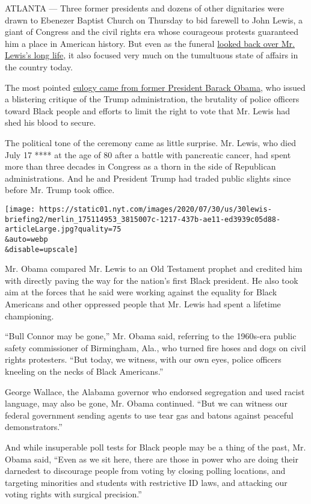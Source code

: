 ATLANTA --- Three former presidents and dozens of other dignitaries were
drawn to Ebenezer Baptist Church on Thursday to bid farewell to John
Lewis, a giant of Congress and the civil rights era whose courageous
protests guaranteed him a place in American history. But even as the
funeral
\href{https://www.nytimes.com/2020/07/17/us/john-lewis-dead.html}{looked
back over Mr. Lewis's long life}, it also focused very much on the
tumultuous state of affairs in the country today.

The most pointed
\href{https://www.nytimes.com/2020/07/30/us/obama-eulogy-john-lewis-full-transcript.html}{eulogy
came from former President Barack Obama}, who issued a blistering
critique of the Trump administration, the brutality of police officers
toward Black people and efforts to limit the right to vote that Mr.
Lewis had shed his blood to secure.

The political tone of the ceremony came as little surprise. Mr. Lewis,
who died July 17 **** at the age of 80 after a battle with pancreatic
cancer, had spent more than three decades in Congress as a thorn in the
side of Republican administrations. And he and President Trump had
traded public slights since before Mr. Trump took office.

\texttt{[image: https://static01.nyt.com/images/2020/07/30/us/30lewis-briefing2/merlin\_175114953\_3815007c-1217-437b-ae11-ed3939c05d88-articleLarge.jpg?quality=75\\\&auto=webp\\\&disable=upscale]}

Mr. Obama compared Mr. Lewis to an Old Testament prophet and credited
him with directly paving the way for the nation's first Black president.
He also took aim at the forces that he said were working against the
equality for Black Americans and other oppressed people that Mr. Lewis
had spent a lifetime championing.

``Bull Connor may be gone,'' Mr. Obama said, referring to the 1960s-era
public safety commissioner of Birmingham, Ala., who turned fire hoses
and dogs on civil rights protesters. ``But today, we witness, with our
own eyes, police officers kneeling on the necks of Black Americans.''

George Wallace, the Alabama governor who endorsed segregation and used
racist language, may also be gone, Mr. Obama continued. ``But we can
witness our federal government sending agents to use tear gas and batons
against peaceful demonstrators.''

And while insuperable poll tests for Black people may be a thing of the
past, Mr. Obama said, ``Even as we sit here, there are those in power
who are doing their darnedest to discourage people from voting by
closing polling locations, and targeting minorities and students with
restrictive ID laws, and attacking our voting rights with surgical
precision.''


